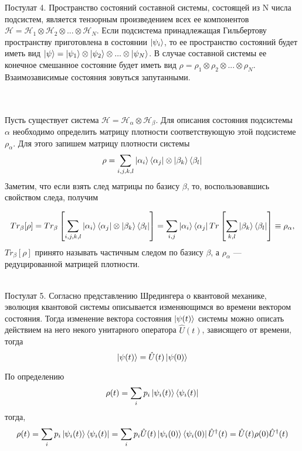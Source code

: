 \documentclass[a4paper, 10pt]{article}
\begin{document}
        \begin{itshape}
            Постулат 4. Пространство состояний составной системы, состоящей из N числа подсистем, является тензорным произведением всех ее компонентов $\mathscr{H} = \mathscr{H}_1  \otimes  \mathscr{H}_2  \otimes ... \otimes \mathscr{H}_N$. Если подсистема принадлежащая Гильбертову пространству приготовлена в состоянии $\ket{\psi_i}$, 
            то ее пространство состояний будет иметь вид $\ket{\psi} = \ket{\psi_1}  \otimes  \ket{\psi_2}  \otimes  ... \otimes  \ket{\psi_N}$. В случае составной системы ее конечное смешанное состояние будет иметь вид $\rho = \rho_1  \otimes  \rho_2  \otimes ... \otimes \rho_N$. Взаимозависимые состояния зовуться запутанными.
        \end{itshape}
        \\
        \\
        Пусть существует система $\mathscr{H} = \mathscr{H}_\alpha \otimes \mathscr{H}_\beta$. Для описания состояния подсистемы $\alpha$ необходимо определить матрицу плотности соответствующую этой подсистеме $\rho_\alpha$. Для этого запишем матрицу плотности системы 
        \begin{equation}
            \rho = \sum_{i,j,k,l} \ket{\alpha_i}\bra{\alpha_j} \otimes \ket{\beta_k} \bra{\beta_l}
        \end{equation}
        Заметим, что если взять след матрицы по базису $\beta$, то, воспользовавшись свойством следа, получим

        \begin{equation}
            Tr_\beta[\rho] = Tr_\beta\left[\sum_{i,j,k,l} \ket{\alpha_i}\bra{\alpha_j} \otimes \ket{\beta_k} \bra{\beta_l}\right] =\sum_{i,j}\ket{\alpha_i}\bra{\alpha_j} Tr\left[\sum_{k,l} \ket{\beta_k} \bra{\beta_l}\right] \equiv \rho_\alpha,
        \end{equation}
        $Tr_\beta[\rho]$ принято называть частичным следом по базису $\beta$, а $\rho_\alpha$ --- редуцированной матрицей плотности.
        \\\\
        \begin{itshape}
            Постулат 5.  Согласно представлению Шредингера о квантовой механике, эволюция квантовой системы описывается изменяющимся во времени вектором состояния. Тогда изменение вектора состояния $\ket{\psi(t)}$ системы можно описать действием на него некого унитарного оператора $\hat{U}(t)$, зависящего от времени, тогда 
            \begin{equation}
                \ket{\psi(t)} = \hat{U}(t)\ket{\psi(0)}
            \end{equation}
        \end{itshape}
        \newpage
       По определению 
       \begin{equation}
        \rho(t) = \sum_{i} p_i \ket{\psi_i(t)} \bra{\psi_i(t)}
       \end{equation}
       тогда,
       \begin{equation}
        \rho(t) = \sum_{i} p_i \ket{\psi_i(t)} \bra{\psi_i(t)} = \sum_{i} p_i \hat{U}(t)\ket{\psi_i(0)}\bra{\psi_i(0)}\hat{U}^{\dagger}(t) = \hat{U}(t)\rho(0)\hat{U}^\dagger(t)
       \end{equation}
\end{document}
